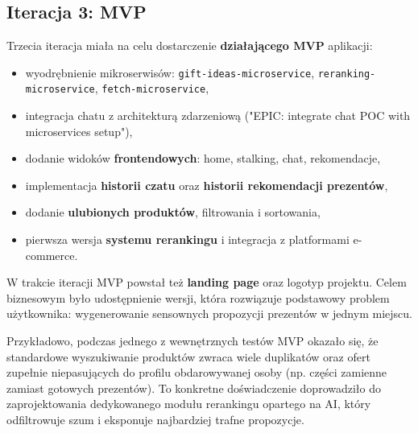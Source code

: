 \documentclass[12pt,a4paper]{article}
\begin{document}
\subsection{Iteracja 3: MVP}
Trzecia iteracja miała na celu dostarczenie \textbf{działającego MVP} aplikacji:
\begin{itemize}
    \item wyodrębnienie mikroserwisów: \texttt{gift-ideas-microservice}, \texttt{reranking-microservice}, \texttt{fetch-microservice},
    \item integracja chatu z architekturą zdarzeniową ("EPIC: integrate chat POC with microservices setup"),
    \item dodanie widoków \textbf{frontendowych}: home, stalking, chat, rekomendacje,
    \item implementacja \textbf{historii czatu} oraz \textbf{historii rekomendacji prezentów},
    \item dodanie \textbf{ulubionych produktów}, filtrowania i sortowania,
    \item pierwsza wersja \textbf{systemu rerankingu} i integracja z platformami e-commerce.
\end{itemize}
W trakcie iteracji MVP powstał też \textbf{landing page} oraz logotyp projektu. Celem biznesowym było udostępnienie wersji, która rozwiązuje podstawowy problem użytkownika: wygenerowanie sensownych propozycji prezentów w jednym miejscu.

Przykładowo, podczas jednego z wewnętrznych testów MVP okazało się, że standardowe wyszukiwanie produktów zwraca wiele duplikatów oraz ofert zupełnie niepasujących do profilu obdarowywanej osoby (np. części zamienne zamiast gotowych prezentów). To konkretne doświadczenie doprowadziło do zaprojektowania dedykowanego modułu rerankingu opartego na AI, który odfiltrowuje szum i eksponuje najbardziej trafne propozycje.
\end{document}
